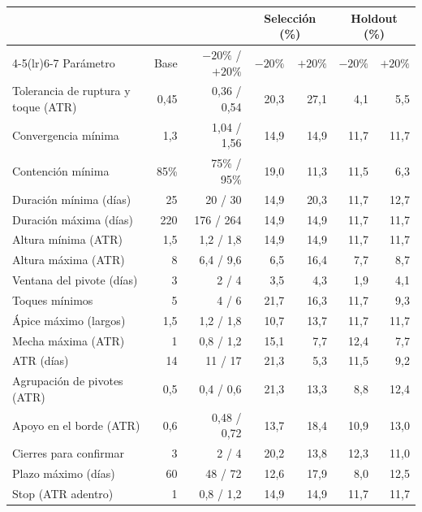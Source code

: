 \documentclass[10pt,a4paper]{article}
\begin{document}
\begin{table}[H]\centering\small\setlength{\tabcolsep}{4.5pt}
\begin{tabular}{@{}lrrrrrr@{}}
\toprule
& & & \multicolumn{2}{c}{Selección (\%)} & \multicolumn{2}{c}{Holdout (\%)} \\
\cmidrule(lr){4-5}\cmidrule(lr){6-7}
Parámetro & Base & $-20\%$ / $+20\%$ & $-20\%$ & $+20\%$ & $-20\%$ & $+20\%$ \\
\midrule
Tolerancia de ruptura y toque (ATR) & 0,45 & 0,36 / 0,54 & 20,3 & 27,1 & 4,1 & 5,5 \\
Convergencia mínima               & 1,3  & 1,04 / 1,56 & 14,9 & 14,9 & 11,7 & 11,7 \\
Contención mínima                 & 85\% & 75\% / 95\% & 19,0 & 11,3 & 11,5 & 6,3 \\
Duración mínima (días)            & 25   & 20 / 30     & 14,9 & 20,3 & 11,7 & 12,7 \\
Duración máxima (días)            & 220  & 176 / 264   & 14,9 & 14,9 & 11,7 & 11,7 \\
Altura mínima (ATR)               & 1,5  & 1,2 / 1,8   & 14,9 & 14,9 & 11,7 & 11,7 \\
Altura máxima (ATR)               & 8    & 6,4 / 9,6   & 6,5  & 16,4 & 7,7  & 8,7 \\
Ventana del pivote (días)         & 3    & 2 / 4       & 3,5  & 4,3  & 1,9  & 4,1 \\
Toques mínimos                    & 5    & 4 / 6       & 21,7 & 16,3 & 11,7 & 9,3 \\
Ápice máximo (largos)             & 1,5  & 1,2 / 1,8   & 10,7 & 13,7 & 11,7 & 11,7 \\
Mecha máxima (ATR)                & 1    & 0,8 / 1,2   & 15,1 & 7,7  & 12,4 & 7,7 \\
ATR (días)                        & 14   & 11 / 17     & 21,3 & 5,3  & 11,5 & 9,2 \\
Agrupación de pivotes (ATR)       & 0,5  & 0,4 / 0,6   & 21,3 & 13,3 & 8,8  & 12,4 \\
Apoyo en el borde (ATR)           & 0,6  & 0,48 / 0,72 & 13,7 & 18,4 & 10,9 & 13,0 \\
Cierres para confirmar            & 3    & 2 / 4       & 20,2 & 13,8 & 12,3 & 11,0 \\
Plazo máximo (días)               & 60   & 48 / 72     & 12,6 & 17,9 & 8,0  & 12,5 \\
Stop (ATR adentro)                & 1    & 0,8 / 1,2   & 14,9 & 14,9 & 11,7 & 11,7 \\

\end{tabular}
\end{table}
\end{document}
